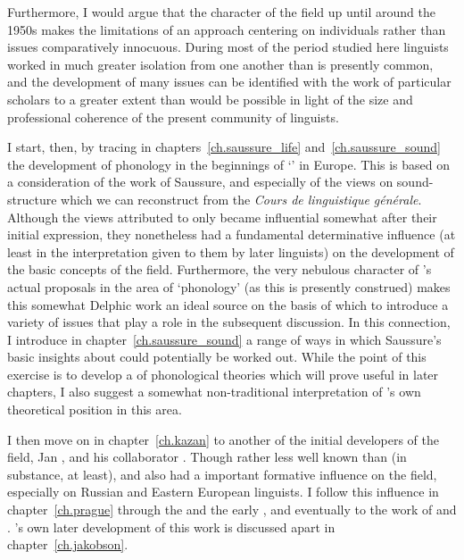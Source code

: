 Furthermore, I would argue that the character of the field up until
around the 1950s makes the limitations of an approach centering on
individuals rather than issues comparatively innocuous.  During most
of the period studied here linguists worked in much greater isolation
from one another than is presently common, and the development of many
issues can be identified with the work of particular scholars to a
greater extent than would be possible in light of the  size and
professional coherence of the present community of linguists.

I start, then, by tracing in chapters~\ref{ch.saussure_life}
and~\ref{ch.saussure_sound} the development of phonology in the
beginnings of `' in Europe.  This is based on a
consideration of the work of Saussure, and especially of the views on
sound-structure which we can reconstruct from the \textsl{Cours de
  linguistique g\'en\'erale}.  Although the views attributed to
{\Saussure} only became influential somewhat after their initial
expression, they nonetheless had a fundamental determinative influence
(at least in the interpretation given to them by later linguists) on
the development of the basic concepts of the field.  Furthermore, the
very nebulous character of {\Saussure}'s actual proposals in the area of
`phonology' (as this is presently construed) makes this somewhat
Delphic work an ideal source on the basis of which to introduce a
variety of issues that play a role in the subsequent discussion. In
this connection, I introduce in chapter~\ref{ch.saussure_sound} a
range of ways in which Saussure's basic insights about 
could potentially be worked out.  While the point of this exercise is
to develop a  of phonological theories which will prove useful
in later chapters, I also suggest a somewhat non-traditional
interpretation of {\Saussure}'s own theoretical position in this area.

I then move on in chapter~\ref{ch.kazan} to another of the initial
developers of the field, Jan {\DeCourtenay}, and his
collaborator .  Though rather less well known than
{\Saussure} (in substance, at least), {\DeCourtenay} and
{\Kruszewski} also had a important formative influence on the field,
especially on {Russian} and Eastern European linguists.  I follow this
influence in chapter~\ref{ch.prague} through the  and the
early , and eventually to the work of {\Trubetzkoy} and
{\Jakobson}.  {\Jakobson}'s own later development of this work is discussed
apart in chapter~\ref{ch.jakobson}.

